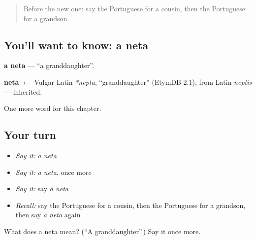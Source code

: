 \begin{quote}
Before the new one: say the Portuguese for a cousin, then the Portuguese for a grandson.
\end{quote}

\subsection*{You'll want to know: a neta}
\textbf{a neta} — \textquotedblleft{}a granddaughter\textquotedblright{}.

\begin{cousinweb}
\textbf{neta} $\leftarrow$ Vulgar Latin \emph{*nepta}, \textquotedblleft{}granddaughter\textquotedblright{} (EtymDB 2.1), from Latin \emph{neptis} — inherited.
\end{cousinweb}

\begin{grammarlens}[title={What you've built}]
One more word for this chapter.
\end{grammarlens}

\subsection*{Your turn}
\begin{itemize}
\raggedright
  \item \emph{Say it:} \emph{a neta}
  \item \emph{Say it:} \emph{a neta}, once more
  \item \emph{Say it:} say \emph{a neta}
  \item \emph{Recall:} say the Portuguese for a cousin, then the Portuguese for a grandson, then say \emph{a neta} again
\end{itemize}

\begin{tcolorbox}[breakable,colback=teal!4,colframe=teal!35!black,title={Before you move on}]
What does a neta mean? (\textquotedblleft{}A granddaughter\textquotedblright{}.) Say it once more.
\end{tcolorbox}
